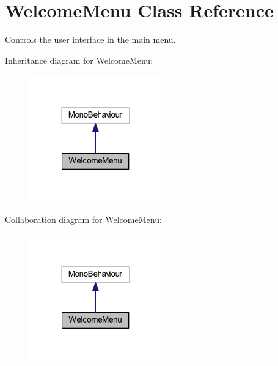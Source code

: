 \hypertarget{class_welcome_menu}{}\section{Welcome\+Menu Class Reference}
\label{class_welcome_menu}


Controls the user interface in the main menu.  




Inheritance diagram for Welcome\+Menu\+:\nopagebreak
\begin{figure}[H]
\begin{center}
\leavevmode
\includegraphics[width=163pt]{class_welcome_menu__inherit__graph}
\end{center}
\end{figure}


Collaboration diagram for Welcome\+Menu\+:\nopagebreak
\begin{figure}[H]
\begin{center}
\leavevmode
\includegraphics[width=163pt]{class_welcome_menu__coll__graph}
\end{center}
\end{figure}
